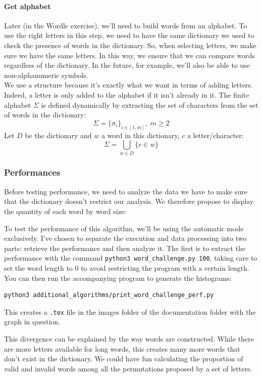 \documentclass[10pt,a4paper,hidelinks]{article}
\begin{document}
\paragraph{Get alphabet}
Later (in the Wordle exercise), we'll need to build words from an alphabet. To use the right letters in this step, we need to have the same dictionary we used to check the presence of words in the dictionary. So, when selecting letters, we make sure we have the same letters. In this way, we ensure that we can compare words regardless of the dictionary. In the future, for example, we'll also be able to use non-alphanumeric symbols.\\

We use a  structure because it's exactly what we want in terms of adding letters. Indeed, a letter is only added to the alphabet if it isn't already in it.\label{set}
The finite alphabet $\Sigma$ is defined dynamically by extracting the set of characters from the set of words in the dictionary:
$$\Sigma = \{\sigma_i\}_{i\in[1, m]},\; m\geqslant 2$$
Let $D$ be the dictionary and $w$ a word in this dictionary, $c$ a letter/character:
$$\Sigma = \bigcup_{w\in D}\{c\in w\}$$

\subsubsection{Performances}
Before testing performance, we need to analyze the data we have to make sure that the dictionary doesn't restrict our analysis. We therefore propose to display the quantity of each word by word size:


To test the performance of this algorithm, we'll be using the automatic mode exclusively. I've chosen to separate the execution and data processing into two parts: retrieve the performance and then analyze it. The first is to extract the performance with the command \verb|python3 word_challenge.py 100|, taking care to set the word length to $0$ to avoid restricting the program with a certain length.\\

You can then run the accompanying program to generate the histograms:
\begin{lstlisting}
python3 additional_algorithms/print_word_challenge_perf.py
\end{lstlisting}
This creates a \verb|.tex| file in the images folder of the documentation folder with the graph in question.\\
\newpage

This divergence can be explained by the way words are constructed. While there are more letters available for long words, this creates many more words that don't exist in the dictionary. We could have fun calculating the proportion of valid and invalid words among all the permutations proposed by a set of letters.\\
\end{document}
